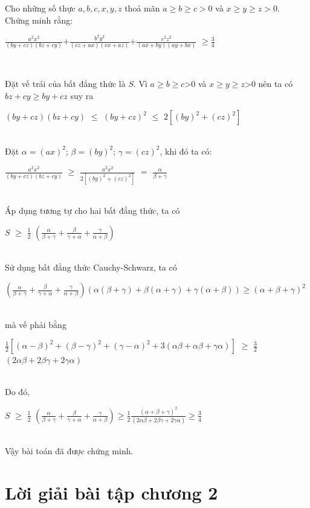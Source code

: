 \begin{baitap}
Cho những số thực $a, b, c, x, y, z$ thoả mãn $a$$\geq$$b$$\geq$$c>0$ và $x$$\geq$$y$$\geq$$z>0$.\\
Chứng minh rằng:\\
\centerline {{$\frac{a^2x^2}{(by+cz)(bz+cy)}$+$\frac{b^2y^2}{(cz+ax)(cx+az)}$+$\frac{c^2z^2}{(ax+by)(ay+bx)}$}
$\geq$$\frac{3}{4}$}\\

\begin{loigiai2}
Đặt vế trái của bất đẳng thức là $S$. Vì $a$$\geq$$b$$\geq$$c$>$0$ và $x$$\geq$$y$$\geq$$z$>$0$ nên ta có
 $bz+cy$$\geq$$by+cz$ suy ra\\
\centerline {$(by+cz)(bz+cy)$ $\leq$ $(by+cz)^2$ $\leq$ $2\left[(by)^2+(cz)^2\right]$ }\\
Đặt $\alpha$$=(ax)^2$; $\beta$$=(by)^2$; $\gamma$$=(cz)^2$, khi đó ta có:\\
\centerline {$\frac{a^2x^2}{(by+cz)(bz+cy)}$ $\geq$ $\frac{a^2x^2}{2\left[(by)^2+(cz)^2\right]}$ $=$ $\frac{\alpha}{{\beta}+
{\gamma}}$}\\
Áp dụng tương tự cho hai bất đẳng thức, ta có\\
\centerline {$S$ $\geq$ $\frac{1}{2}$ $({\frac{\alpha}{{\beta}+{\gamma}}}+{\frac{\beta}{{\gamma}+{\alpha}}}
+{\frac{\gamma}{{\alpha}+{\beta}}})$}\\
Sử dụng bất đẳng thức Cauchy-Schwarz, ta có\\
\centerline {$({\frac{\alpha}{{\beta}+{\gamma}}}+{\frac{\beta}{{\gamma}+{\alpha}}}+{\frac{\gamma}{{\alpha}
+{\beta}}})$$({\alpha}({\beta}+{\gamma})+{\beta}({\alpha}+{\gamma})+{\gamma}({\alpha}+{\beta})) {\geq} ({\alpha}
+{\beta}+{\gamma})^2$ }\\
mà vế phải bằng\\
\centerline  {    $\frac{1}{2}$$\left[({\alpha}-{\beta})^2+({\beta}-{\gamma})^2+({\gamma}-{\alpha})^2+3({\alpha}{\beta}
+{\alpha}{\beta}+{\gamma}{\alpha})\right]$ $\geq$ $\frac{3}{2}$ $(2{\alpha}{\beta}+2{\beta}{\gamma}+2{\gamma}{\alpha})$ }\\
Do đó,\\
\centerline {$S$ $\geq$ $\frac{1}{2}$ 
$({\frac{\alpha}{{\beta}+{\gamma}}}+{\frac{\beta}{{\gamma}+{\alpha}}}
+{\frac{\gamma}{{\alpha}+{\beta}}})\geq\frac{1}{2}\frac{({\alpha}+{\beta}+{\gamma})^2}{(2{\alpha}{\beta}+2{\beta}{\gamma}+2{\gamma}{\alpha})}\geq\frac{3}{4}$                           }\\
Vậy bài toán đã được chứng minh.
\end{loigiai2}
\end{baitap}


\section{Lời giải bài tập chương 2}
{\small}

